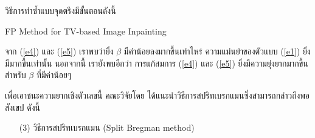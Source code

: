 \documentclass[hidelinks, a4paper,12pt]{article}
\numberwithin{equation}{section}							%
\numberwithin{equation}{section}
\begin{document}
{\clearpage
วิธีการทำซ้ำแบบจุดตรึงมีขั้นตอนดังนี้
\begin{algorithm}[H]
	\caption{FP Method for TV-based Image Inpainting}	
\end{algorithm}
\vspace{1cm}
\hspace{1cm} จาก (\ref{e4}) และ (\ref{e5}) เราพบว่ายิ่ง $\beta$ มีค่าน้อยลงมากขึ้นเท่าไหร่ ความแม่นยำของตัวแบบ (\ref{e1}) ยิ่งมีมากขึ้นเท่านั้น นอกจากนี้ เรายังพบอีกว่า การแก้สมการ (\ref{e4}) และ (\ref{e5}) ยิ่งมีความยุ่งยากมากขึ้นสำหรับ $\beta$ ที่มีค่าน้อยๆ 

\hspace{1cm} เพื่อเอาชนะความยากเชิงตัวเลขนี้ คณะวิจัยโดย \cite{ref:splitbergman-inpaint} ได้แนะนำวิธีการสปริทเบรกแมนซึ่งสามารถกล่าวถึงพอสังเขป ดังนี้
\clearpage
\begin{itemize}
	\item [(3)] วิธีการสปริทเบรกแมน (Split Bregman method)
	

\end{itemize}}
\end{document}
